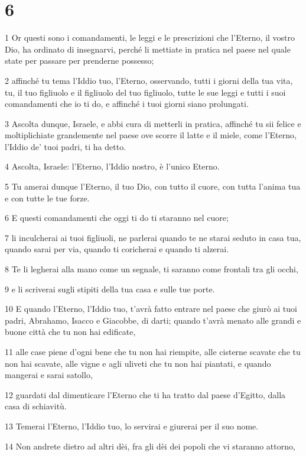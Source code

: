 \chapter{6}

\par 1 Or questi sono i comandamenti, le leggi e le prescrizioni che l'Eterno, il vostro Dio, ha ordinato di insegnarvi, perché li mettiate in pratica nel paese nel quale state per passare per prenderne possesso;
\par 2 affinché tu tema l'Iddio tuo, l'Eterno, osservando, tutti i giorni della tua vita, tu, il tuo figliuolo e il figliuolo del tuo figliuolo, tutte le sue leggi e tutti i suoi comandamenti che io ti do, e affinché i tuoi giorni siano prolungati.
\par 3 Ascolta dunque, Israele, e abbi cura di metterli in pratica, affinché tu sii felice e moltiplichiate grandemente nel paese ove scorre il latte e il miele, come l'Eterno, l'Iddio de' tuoi padri, ti ha detto.
\par 4 Ascolta, Israele: l'Eterno, l'Iddio nostro, è l'unico Eterno.
\par 5 Tu amerai dunque l'Eterno, il tuo Dio, con tutto il cuore, con tutta l'anima tua e con tutte le tue forze.
\par 6 E questi comandamenti che oggi ti do ti staranno nel cuore;
\par 7 li inculcherai ai tuoi figliuoli, ne parlerai quando te ne starai seduto in casa tua, quando sarai per via, quando ti coricherai e quando ti alzerai.
\par 8 Te li legherai alla mano come un segnale, ti saranno come frontali tra gli occhi,
\par 9 e li scriverai sugli stipiti della tua casa e sulle tue porte.
\par 10 E quando l'Eterno, l'Iddio tuo, t'avrà fatto entrare nel paese che giurò ai tuoi padri, Abrahamo, Isacco e Giacobbe, di darti; quando t'avrà menato alle grandi e buone città che tu non hai edificate,
\par 11 alle case piene d'ogni bene che tu non hai riempite, alle cisterne scavate che tu non hai scavate, alle vigne e agli uliveti che tu non hai piantati, e quando mangerai e sarai satollo,
\par 12 guardati dal dimenticare l'Eterno che ti ha tratto dal paese d'Egitto, dalla casa di schiavitù.
\par 13 Temerai l'Eterno, l'Iddio tuo, lo servirai e giurerai per il suo nome.
\par 14 Non andrete dietro ad altri dèi, fra gli dèi dei popoli che vi staranno attorno,
